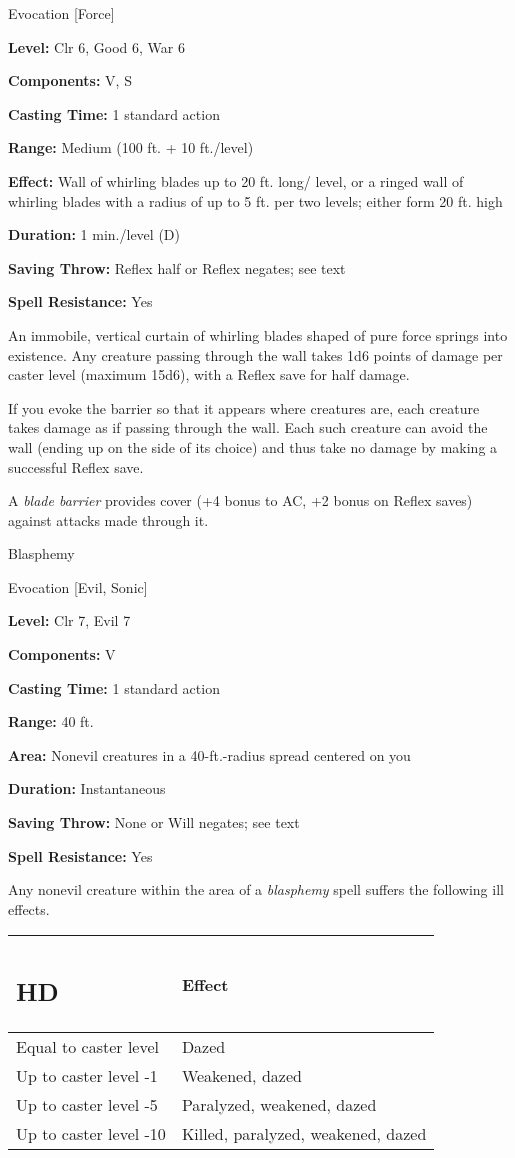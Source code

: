 \documentclass{article}
\begin{document}
Evocation [Force]

\textbf{Level:} Clr 6, Good 6, War 6

\textbf{Components:} V, S

\textbf{Casting Time:} 1 standard action

\textbf{Range: }Medium (100 ft. + 10 ft./level)

\textbf{Effect: }Wall of whirling blades up to 20 ft. long/ level, or a ringed 
wall of whirling blades with a radius of up to 5 ft. per two levels; either form 
20 ft. high

\textbf{Duration:} 1 min./level (D)

\textbf{Saving Throw:} Reflex half or Reflex negates; see text

\textbf{Spell Resistance:} Yes

An immobile, vertical curtain of whirling blades shaped of pure force springs into 
existence. Any creature passing through the wall takes 1d6 points of damage per 
caster level (maximum 15d6), with a Reflex save for half damage.

If you evoke the barrier so that it appears where creatures are, each creature 
takes damage as if passing through the wall. Each such creature can avoid the wall 
(ending up on the side of its choice) and thus take no damage by making a successful 
Reflex save.

A \textit{blade barrier }provides cover (+4 bonus to AC, +2 bonus on Reflex saves) 
against attacks made through it.

\vspace{12pt}
Blasphemy

Evocation [Evil, Sonic]

\textbf{Level:} Clr 7, Evil 7

\textbf{Components:} V

\textbf{Casting Time:} 1 standard action

\textbf{Range:} 40 ft.

\textbf{Area:} Nonevil creatures in a 40-ft.-radius spread centered on you

\textbf{Duration:} Instantaneous

\textbf{Saving Throw:} None or Will negates; see text

\textbf{Spell Resistance:} Yes

Any nonevil creature within the area of a \textit{blasphemy }spell suffers the 
following ill effects.

\begin{tabular}{|>{\raggedright}p{86pt}|>{\raggedright}p{140pt}|}
\hline
\subsection*{H\textbf{D}} & E\textbf{ffect}\tabularnewline
\hline
Equal to caster level & Dazed\tabularnewline
\hline
Up to caster level -1 & Weakened, dazed\tabularnewline
\hline
Up to caster level -5 & Paralyzed, weakened, dazed\tabularnewline
\hline
Up to caster level -10 & Killed, paralyzed, weakened, dazed\tabularnewline
\hline
\end{tabular}
\end{document}

